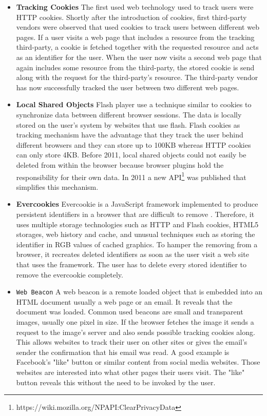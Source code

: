 \documentclass[article,colorback,accentcolor=tud9c,type=bsc]{tudthesis}
\begin{document}
	\begin{itemize}
		\item \textbf{Tracking Cookies} The first used web technology used to track users were HTTP cookies. Shortly after the introduction of cookies, first third-party vendors were observed that used cookies to track users between different web pages. If a user visits a web page that includes a resource from the tracking third-party, a cookie is fetched together with the requested resource and acts as an identifier for the user. When the user now visits a second web page that again includes some resource from the third-party, the stored cookie is send along with the request for the third-party's resource. The third-party vendor has now successfully tracked the user between two different web pages.  
		
		\item \textbf{Local Shared Objects} Flash player use a technique similar to cookies to synchronize data between different browser sessions. The data is locally stored on the user's system by websites that use flash. Flash cookies as tracking mechanism have the advantage that they track the user behind different browsers and they can store up to 100KB whereas HTTP cookies can only store 4KB. Before 2011, local shared objects could not easily be deleted from within the browser because browser plugins hold the responsibility for their own data. In 2011 a new API\footnote{https://wiki.mozilla.org/NPAPI:ClearPrivacyData} was published that simplifies this mechanism. 
		
		\item \textbf{Evercookies} Evercookie is a JavaScript framework implemented to produce persistent identifiers in a browser that are difficult to remove \cite{evercookie}. Therefore, it uses multiple storage technologies such as HTTP and Flash cookies, HTML5 storages, web history and cache, and unusual techniques such as storing the identifier in RGB values of cached graphics. To hamper the removing from a browser, it recreates deleted identifiers as soon as the user visit a web site that uses the framework. The user has to delete every stored identifier to remove the evercookie completely. 
		
		\item \texttt{Web Beacon} A web beacon is a remote loaded object that is embedded into an HTML document usually a web page or an email. It reveals that the document was loaded. Common used beacons are small and transparent images, usually one pixel in size. If the browser fetches the image it sends a request to the image's server and also sends possible tracking cookies along. This allows websites to track their user on other sites or gives the email's sender the confirmation that his email was read. A good example is Facebook's "like" button or similar content from social media websites. Those websites are interested into what other pages their users visit. The "like" button reveals this without the need to be invoked by the user. 
	\end{itemize}
	
\end{document}
